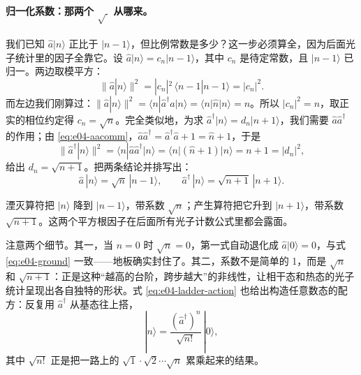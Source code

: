 \paragraph{归一化系数：那两个 \(\sqrt{\ }\) 从哪来。}
我们已知 \(\hat a|n\rangle\) 正比于 \(|n-1\rangle\)，但比例常数是多少？这一步必须算全，因为后面光子统计里的因子全靠它。设 \(\hat a|n\rangle=c_n|n-1\rangle\)，其中 \(c_n\) 是待定常数，且 \(|n-1\rangle\) 已归一。两边取模平方：
\[
  \big\|\hat a|n\rangle\big\|^2
  =|c_n|^2\,\langle n-1|n-1\rangle
  =|c_n|^2 .
\]
而左边我们刚算过：\(\big\|\hat a|n\rangle\big\|^2=\langle n|\hat a^\dagger\hat a|n\rangle=\langle n|\hat n|n\rangle=n\)。所以 \(|c_n|^2=n\)，取正实的相位约定得 \(c_n=\sqrt{n}\)。完全类似地，为求 \(\hat a^\dagger|n\rangle=d_n|n+1\rangle\)，我们需要 \(\hat a\hat a^\dagger\) 的作用；由 \eqref{eq:e04-aacomm}，\(\hat a\hat a^\dagger=\hat a^\dagger\hat a+1=\hat n+1\)，于是
\[
  \big\|\hat a^\dagger|n\rangle\big\|^2
  =\langle n|\hat a\hat a^\dagger|n\rangle
  =\langle n|(\hat n+1)|n\rangle
  =n+1
  =|d_n|^2,
\]
给出 \(d_n=\sqrt{n+1}\)。把两条结论并排写出：
\begin{equation}
  \hat a\,|n\rangle=\sqrt{n}\,|n-1\rangle,
  \qquad
  \hat a^\dagger\,|n\rangle=\sqrt{n+1}\,|n+1\rangle .
  \label{eq:e04-ladder-action}
\end{equation}
\begin{formulaexplain}
湮灭算符把 \(|n\rangle\) 降到 \(|n-1\rangle\)，带系数 \(\sqrt{n}\)；产生算符把它升到 \(|n+1\rangle\)，带系数 \(\sqrt{n+1}\)。这两个平方根因子在后面所有光子计数公式里都会露面。
\end{formulaexplain}
注意两个细节。其一，当 \(n=0\) 时 \(\sqrt{n}=0\)，第一式自动退化成 \(\hat a|0\rangle=0\)，与式 \eqref{eq:e04-ground} 一致——地板确实封住了。其二，系数不是简单的 1，而是 \(\sqrt n\) 和 \(\sqrt{n+1}\)：正是这种“越高的台阶，跨步越大”的非线性，让相干态和热态的光子统计呈现出各自独特的形状。式 \eqref{eq:e04-ladder-action} 也给出构造任意数态的配方：反复用 \(\hat a^\dagger\) 从基态往上搭，
\[
  |n\rangle=\frac{(\hat a^\dagger)^n}{\sqrt{n!}}\,|0\rangle,
\]
其中 \(\sqrt{n!}\) 正是把一路上的 \(\sqrt{1}\cdot\sqrt{2}\cdots\sqrt{n}\) 累乘起来的结果。

